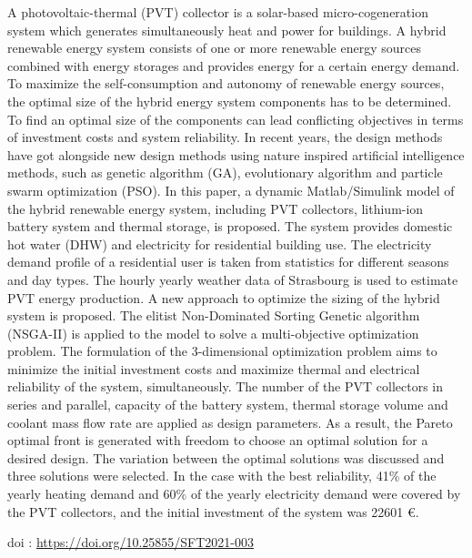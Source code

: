 {\normalsize
A photovoltaic-thermal (PVT) collector is a solar-based micro-cogeneration system which generates simultaneously heat and power for buildings. A hybrid renewable energy system consists of one or more renewable energy sources combined with energy storages and provides energy for a certain energy demand. To maximize the self-consumption and autonomy of renewable energy sources, the optimal size of the hybrid energy system components has to be determined. To find an optimal size of the components can lead conflicting objectives in terms of investment costs and system reliability. In recent years, the design methods have got alongside new design methods using nature inspired artificial intelligence methods, such as genetic algorithm (GA), evolutionary algorithm and particle swarm optimization (PSO). In this paper, a dynamic Matlab/Simulink model of the hybrid renewable energy system, including PVT collectors, lithium-ion battery system and thermal storage, is proposed. The system provides domestic hot water (DHW) and electricity for residential building use. The electricity demand profile of a residential user is taken from statistics for different seasons and day types. The hourly yearly weather data of Strasbourg is used to estimate PVT energy production. A new approach to optimize the sizing of the hybrid system is proposed. The elitist Non-Dominated Sorting Genetic algorithm (NSGA-II) is applied to the model to solve a multi-objective optimization problem. The formulation of the 3-dimensional optimization problem aims to minimize the initial investment costs and maximize thermal and electrical reliability of the system, simultaneously. The number of the PVT collectors in series and parallel, capacity of the battery system, thermal storage volume and coolant mass flow rate are applied as design parameters. As a result, the Pareto optimal front is generated with freedom to choose an optimal solution for a desired design. The variation between the optimal solutions was discussed and three solutions were selected. In the case with the best reliability, 41\% of the yearly heating demand and 60\% of the yearly electricity demand were covered by the PVT collectors, and the initial investment of the system was 22601 €.

 \vfill doi : \url{https://doi.org/10.25855/SFT2021-003}

}
 
